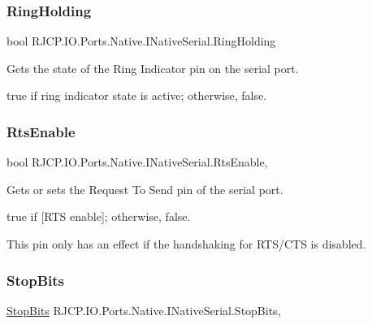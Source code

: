 \subsubsection{\texorpdfstring{RingHolding}{RingHolding}}
{\footnotesize\ttfamily bool R\+J\+C\+P.\+I\+O.\+Ports.\+Native.\+I\+Native\+Serial.\+Ring\+Holding\hspace{0.3cm}{\ttfamily [get]}}



Gets the state of the Ring Indicator pin on the serial port. 

{\ttfamily true} if ring indicator state is active; otherwise, {\ttfamily false}. \mbox{\label{interface_r_j_c_p_1_1_i_o_1_1_ports_1_1_native_1_1_i_native_serial_a04ee5d783d150fb1e92ef84884a5c99b}} 
\subsubsection{\texorpdfstring{RtsEnable}{RtsEnable}}
{\footnotesize\ttfamily bool R\+J\+C\+P.\+I\+O.\+Ports.\+Native.\+I\+Native\+Serial.\+Rts\+Enable\hspace{0.3cm}{\ttfamily [get]}, {\ttfamily [set]}}



Gets or sets the Request To Send pin of the serial port. 

{\ttfamily true} if \mbox{[}R\+TS enable\mbox{]}; otherwise, {\ttfamily false}. 

This pin only has an effect if the handshaking for R\+T\+S/\+C\+TS is disabled. \mbox{\label{interface_r_j_c_p_1_1_i_o_1_1_ports_1_1_native_1_1_i_native_serial_a1b77444f80e7925f39171349b73858c0}} 
\subsubsection{\texorpdfstring{StopBits}{StopBits}}
{\footnotesize\ttfamily \mbox{\hyperlink{namespace_r_j_c_p_1_1_i_o_1_1_ports_a56a13b591d46736acafe20f2976c84fa}{Stop\+Bits}} R\+J\+C\+P.\+I\+O.\+Ports.\+Native.\+I\+Native\+Serial.\+Stop\+Bits\hspace{0.3cm}{\ttfamily [get]}, {\ttfamily [set]}}



